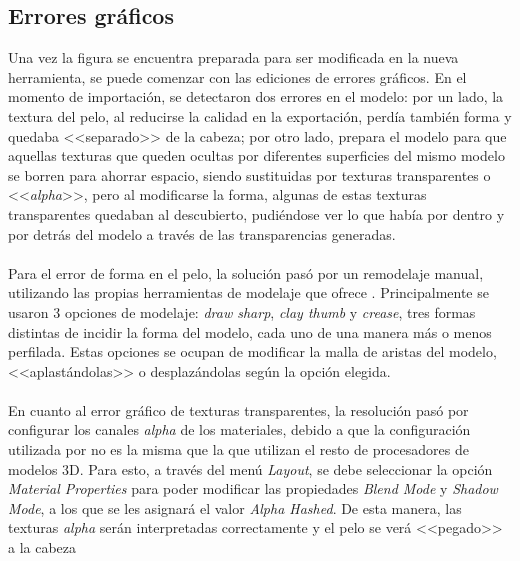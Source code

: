 \documentclass{subfiles}
\begin{document}
    \subsection{Errores gráficos}
    \label{sec:4.2.1}
    Una vez la figura se encuentra preparada para ser modificada en la nueva herramienta, se puede comenzar con las ediciones de errores gráficos. En el momento de importación, se detectaron dos errores en el modelo: por un lado, la textura del pelo, al reducirse la calidad en la exportación, perdía también forma y quedaba <<separado>> de la cabeza; por otro lado, \makehuman prepara el modelo para que aquellas texturas que queden ocultas por diferentes superficies del mismo modelo se borren para ahorrar espacio, siendo sustituidas por texturas transparentes o <<\textit{alpha}>>, pero al modificarse la forma, algunas de estas texturas transparentes quedaban al descubierto, pudiéndose ver lo que había por dentro y por detrás del modelo a través de las transparencias generadas.

    \paragraph{}
    Para el error de forma en el pelo, la solución pasó por un remodelaje manual, utilizando las propias herramientas de modelaje que ofrece \blender. Principalmente se usaron 3 opciones de modelaje: \textit{draw sharp}, \textit{clay thumb} y \textit{crease}, tres formas distintas de incidir la forma del modelo, cada uno de una manera más o menos perfilada. Estas opciones se ocupan de modificar la malla de aristas del modelo, <<aplastándolas>> o desplazándolas según la opción elegida.

    \paragraph{}
    En cuanto al error gráfico de texturas transparentes, la resolución pasó por configurar los canales \textit{alpha} de los materiales, debido a que la configuración utilizada por \makehuman no es la misma que la que utilizan el resto de procesadores de modelos 3D. Para esto, a través del menú \textit{Layout}, se debe seleccionar la opción \textit{Material Properties} para poder modificar las propiedades \textit{Blend Mode} y \textit{Shadow Mode}, a los que se les asignará el valor \textit{Alpha Hashed}. De esta manera, las texturas \textit{alpha} serán interpretadas correctamente y el pelo se verá <<pegado>> a la cabeza
\end{document}
